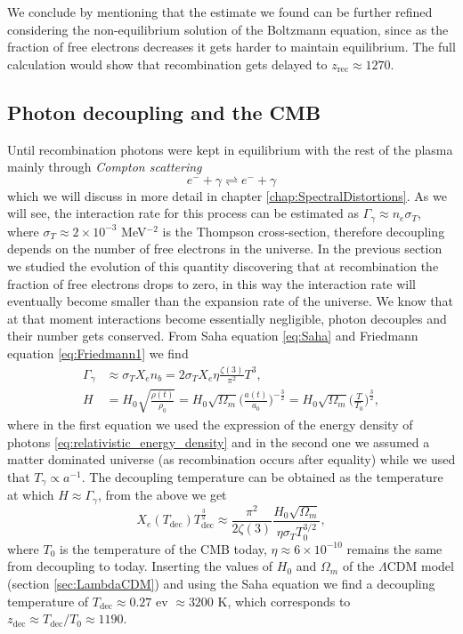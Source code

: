We conclude by mentioning that the estimate we found can be further refined considering the non-equilibrium solution of the Boltzmann equation, since as the fraction of free electrons decreases it gets harder to maintain equilibrium. The full calculation would show that recombination gets delayed to $z_\text{rec}\approx 1270$.
\subsection{Photon decoupling and the CMB}
\label{sec:CMB_decoupling}
Until recombination photons were kept in equilibrium with the rest of the plasma mainly through \emph{Compton scattering}
$$
e^-+\gamma\rightleftharpoons e^-+\gamma 
$$
which we will discuss in more detail in chapter \ref{chap:SpectralDistortions}. As we will see, the interaction rate for this process can be estimated as $\Gamma_\gamma\approx n_e\sigma_T$, where $\sigma_T\approx2\times 10^{-3}$ MeV$^{-2}$ is the Thompson cross-section, therefore decoupling depends on the number of free electrons in the universe. In the previous section we studied the evolution of this quantity discovering that at recombination the fraction of free electrons drops to zero, in this way the interaction rate will eventually become smaller than the expansion rate of the universe. We know that at that moment interactions become essentially negligible, photon decouples and their number gets conserved. From Saha equation \eqref{eq:Saha} and Friedmann equation \eqref{eq:Friedmann1} we find
\begin{align*}
    \Gamma_\gamma&\approx \sigma_T X_e n_b=2\sigma_T X_e\eta\frac{\zeta(3)}{\pi^2}T^3,\\
    H&=H_0\sqrt{\frac{\rho(t)}{\rho_0}}=H_0\sqrt{\Omega_m}\bigg(\frac{a(t)}{a_0}\bigg)^{-\frac{3}{2}}=H_0\sqrt{\Omega_m}\bigg(\frac{T}{T_0}\bigg)^{\frac{3}{2}},
\end{align*}
where in the first equation we used the expression of the energy density of photons \eqref{eq:relativistic_energy_density} and in the second one we assumed a matter dominated universe (as recombination occurs after equality) while we used that $T_\gamma\propto a^{-1}$. The decoupling temperature can be obtained as the temperature at which $H\approx\Gamma_\gamma$, from the above we get
$$
X_e(T_\text{dec})T_\text{dec}^{\frac{3}{2}}\approx\frac{\pi^2}{2\zeta(3)}\frac{H_0\sqrt{\Omega_m}}{\eta\sigma_T T_0^{3/2}},
$$
where $T_0$ is the temperature of the CMB today, $\eta\approx6\times10^{-10}$ remains the same from decoupling to today. Inserting the values of $H_0$ and $\Omega_m$ of the $\Lambda$CDM model (section \ref{sec:LambdaCDM}) and using the Saha equation we find a decoupling temperature of $T_\text{dec}\approx 0.27$ ev $\approx3200$ K, which corresponds to $z_\text{dec}\approx T_\text{dec}/T_0\approx 1190$. 

